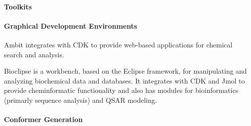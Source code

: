 \paragraph{Toolkits}

\paragraph{Graphical Development Environments}

Ambit \cite{Jeliazkova_2011} integrates with CDK to provide web-based applications for chemical search and analysis.

Bioclipse is a workbench, based on the Eclipse framework, for manipulating and analyzing biochemical data and databases. It integrates with CDK and Jmol to provide cheminformatic functionality and also has modules for bioinformatics (primarly sequence analysis) and QSAR modeling.

\paragraph{Conformer Generation}